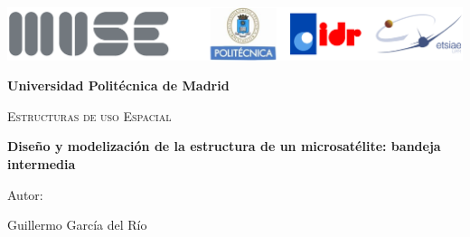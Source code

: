 \documentclass{article}
\numberwithin{equation}{section}
\numberwithin{equation}{subsection}
\begin{document}
\begin{center}
\thispagestyle{empty}

\includegraphics[width=16.5cm]{Logo_portada.png} \\

\vspace{2.5cm}

{\huge \textbf{Universidad Politécnica de Madrid}}\\
\vspace{1cm} 
{\scshape\Large Estructuras de uso Espacial \par}
\begin{center}
\vspace{3.5 cm}
{\bfseries\Huge Diseño y modelización de la estructura de un microsatélite: bandeja intermedia \par}
\vspace{7 cm}

\vfill
{\Large Autor:  \par}

{\Large Guillermo García del Río \par}

\end{center}
\end{center}

\thispagestyle{empty}

\newpage
{} %


\tableofcontents


\listoffigures


\listoftables


\setlength{\parskip}{4mm}
\setlength{\parindent}{20pt}
\setlength{\headheight}{16.07225pt}

\newpage
{}








\newpage
\clearpage

\printbibliography[title = {Bibliografía}]

\newpage
\clearpage

% 
\end{document}
